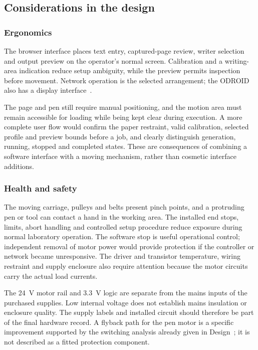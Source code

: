 \subsection{Considerations in the design}
\label{sec:dis-considerations}
\subsubsection{Ergonomics}
The browser interface places text entry, captured-page review, writer selection and output preview on the operator's normal screen. Calibration and a writing-area indication reduce setup ambiguity, while the preview permits inspection before movement. Network operation is the selected arrangement; the ODROID also has a display interface~\cite{odroidn2ds}.

The page and pen still require manual positioning, and the motion area must remain accessible for loading while being kept clear during execution. A more complete user flow would confirm the paper restraint, valid calibration, selected profile and preview bounds before a job, and clearly distinguish generation, running, stopped and completed states. These are consequences of combining a software interface with a moving mechanism, rather than cosmetic interface additions.

\subsubsection{Health and safety}
The moving carriage, pulleys and belts present pinch points, and a protruding pen or tool can contact a hand in the working area. The installed end stops, limits, abort handling and controlled setup procedure reduce exposure during normal laboratory operation. The software stop is useful operational control; independent removal of motor power would provide protection if the controller or network became unresponsive. The driver and transistor temperature, wiring restraint and supply enclosure also require attention because the motor circuits carry the actual load currents.

The 24~V motor rail and 3.3~V logic are separate from the mains inputs of the purchased supplies. Low internal voltage does not establish mains insulation or enclosure quality. The supply labels and installed circuit should therefore be part of the final hardware record. A flyback path for the pen motor is a specific improvement supported by the switching analysis already given in Design~\cite{rohmlowside2026}; it is not described as a fitted protection component.

